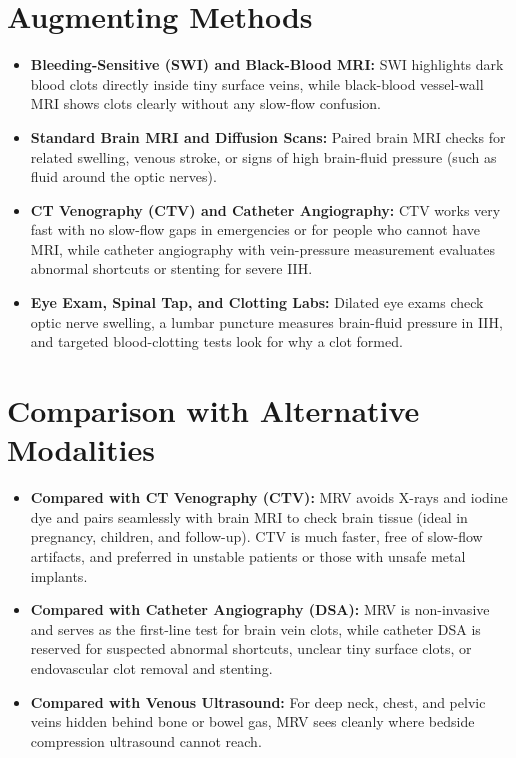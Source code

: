 \section{Augmenting Methods}
\begin{itemize}
\item \textbf{Bleeding-Sensitive (SWI) and Black-Blood MRI:} SWI highlights dark blood clots directly inside tiny surface veins, while black-blood vessel-wall MRI shows clots clearly without any slow-flow confusion.
\item \textbf{Standard Brain MRI and Diffusion Scans:} Paired brain MRI checks for related swelling, venous stroke, or signs of high brain-fluid pressure (such as fluid around the optic nerves).
\item \textbf{CT Venography (CTV) and Catheter Angiography:} CTV works very fast with no slow-flow gaps in emergencies or for people who cannot have MRI, while catheter angiography with vein-pressure measurement evaluates abnormal shortcuts or stenting for severe IIH.
\item \textbf{Eye Exam, Spinal Tap, and Clotting Labs:} Dilated eye exams check optic nerve swelling, a lumbar puncture measures brain-fluid pressure in IIH, and targeted blood-clotting tests look for why a clot formed.
\end{itemize}

\section{Comparison with Alternative Modalities}
\begin{itemize}
\item \textbf{Compared with CT Venography (CTV):} MRV avoids X-rays and iodine dye and pairs seamlessly with brain MRI to check brain tissue (ideal in pregnancy, children, and follow-up). CTV is much faster, free of slow-flow artifacts, and preferred in unstable patients or those with unsafe metal implants.
\item \textbf{Compared with Catheter Angiography (DSA):} MRV is non-invasive and serves as the first-line test for brain vein clots, while catheter DSA is reserved for suspected abnormal shortcuts, unclear tiny surface clots, or endovascular clot removal and stenting.
\item \textbf{Compared with Venous Ultrasound:} For deep neck, chest, and pelvic veins hidden behind bone or bowel gas, MRV sees cleanly where bedside compression ultrasound cannot reach.
\end{itemize}

